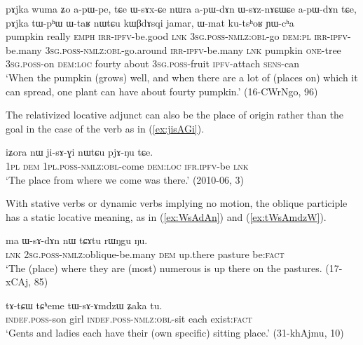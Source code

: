 \begin{exe}
\ex \label{ex:WsAznACWCe}
\gll  pɤjka wuma ʑo a-pɯ-pe, tɕe ɯ-sɤx-ɕe nɯra a-pɯ-dɤn ɯ-sɤz-nɤɕɯɕe a-pɯ-dɤn tɕe, pɤjka tɯ-pʰɯ ɯ-taʁ nɯtɕu kɯβdɤsqi jamar, ɯ-mat ku-tsʰoʁ ɲɯ-cʰa \\
pumpkin really \textsc{emph} \textsc{irr}-\textsc{ipfv}-be.good \textsc{lnk} \textsc{3sg}.\textsc{poss}-\textsc{nmlz}:\textsc{obl}-go \textsc{dem}:\textsc{pl} \textsc{irr}-\textsc{ipfv}-be.many \textsc{3sg}.\textsc{poss}-\textsc{nmlz}:\textsc{obl}-go.around \textsc{irr}-\textsc{ipfv}-be.many  \textsc{lnk} pumpkin \textsc{one}-tree \textsc{3sg}.\textsc{poss}-on \textsc{dem}:\textsc{loc} fourty about \textsc{3sg}.\textsc{poss}-fruit \textsc{ipfv}-attach \textsc{sens}-can \\
\glt `When the pumpkin (grows) well, and when there are a lot of (places on) which it can spread, one plant can have about fourty pumpkin.' (16-CWrNgo, 96)
\end{exe}

The relativized locative adjunct can also be the place of origin rather than the goal in the case of the verb  as in (\ref{ex:jisAGi}).

\begin{exe}
\ex \label{ex:jisAGi}
\gll  iʑora nɯ ji-sɤ-ɣi nɯtɕu pjɤ-ŋu tɕe. \\
\textsc{1pl} \textsc{dem} \textsc{1pl}.\textsc{poss}-\textsc{nmlz}:\textsc{obl}-come \textsc{dem}:\textsc{loc} \textsc{ifr}.\textsc{ipfv}-be \textsc{lnk} \\
\glt  `The place from where we come was there.' (2010-06, 3)
\end{exe}

With stative verbs or dynamic verbs implying no motion, the oblique participle has a static locative meaning, as in (\ref{ex:WsAdAn}) and (\ref{ex:tWsAmdzW}).

\begin{exe}
\ex \label{ex:WsAdAn}
\gll  ma ɯ-sɤ-dɤn nɯ tɕɤtu rɯŋgu ŋu. \\
\textsc{lnk} \textsc{2sg}.\textsc{poss}-\textsc{nmlz}:oblique-be.many \textsc{dem} up.there pasture be:\textsc{fact} \\
\glt `The (place) where they are (most) numerous is up there on the pastures. (17-xCAj, 85)
\end{exe}

\begin{exe}
\ex \label{ex:tWsAmdzW}
\gll tɤ-tɕɯ tɕʰeme tɯ-sɤ-ɤmdzɯ ʑaka tu. \\
\textsc{indef}.\textsc{poss}-son girl \textsc{indef}.\textsc{poss}-\textsc{nmlz}:\textsc{obl}-sit each exist:\textsc{fact} \\ 
\glt `Gents and ladies each have their (own specific) sitting place.' (31-khAjmu, 10)
\end{exe}


